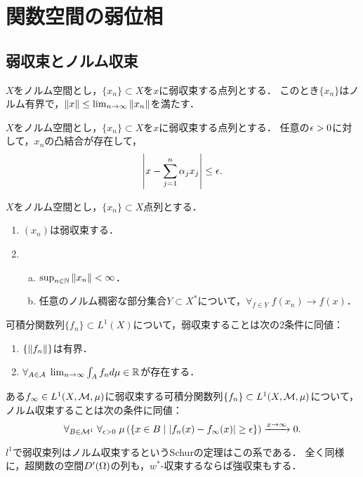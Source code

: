 \documentclass[uplatex,dvipdfmx]{jsreport}
\begin{document}
\section{関数空間の弱位相}

\subsection{弱収束とノルム収束}

\begin{theorem}
    $X$をノルム空間とし，$\{x_n\}\subset X$を$x$に弱収束する点列とする．
    このとき$\{x_n\}$はノルム有界で，$\|x\|\le\lim_{n\to\infty}\|x_n\|$を満たす．
\end{theorem}

\begin{theorem}[Mazur]
    $X$をノルム空間とし，$\{x_n\}\subset X$を$x$に弱収束する点列とする．
    任意の$\epsilon>0$に対して，$x_n$の凸結合が存在して，
    \[\left|x-\sum_{j=1}^n\alpha_jx_j\right|\le\epsilon.\]
\end{theorem}

\begin{theorem}
    $X$をノルム空間とし，$\{x_n\}\subset X$点列とする．
    \begin{enumerate}
        \item $(x_n)$は弱収束する．
        \item \begin{enumerate}[(a)]
            \item $\sup_{n\in\mathbb{N}}\|x_n\|<\infty$．
            \item 任意のノルム稠密な部分集合$Y\subset X^*$について，$\forall_{f\in Y}\;f(x_n)\to f(x)$．
        \end{enumerate}
    \end{enumerate}
\end{theorem}

\begin{corollary}
    可積分関数列$\{f_n\}\subset L^1(X)$について，弱収束することは次の2条件に同値：
    \begin{enumerate}
        \item $\{\|f_n\|\}$は有界．
        \item $\forall_{A\in\mathcal{A}}\;\lim_{n\to\infty}\int_Af_nd\mu\in\mathbb{R}$が存在する．
    \end{enumerate}
\end{corollary}

\begin{corollary}
    ある$f_\infty\in L^1(X,\mathcal{M},\mu)$に弱収束する可積分関数列$\{f_n\}\subset L^1(X,\mathcal{M},\mu)$について，ノルム収束することは次の条件に同値：
    \[\forall_{B\in\mathcal{M}^1}\;\forall_{\epsilon>0}\;\mu\left(\left\{x\in B\mid\lvert f_n(x)-f_\infty(x)\rvert\ge\epsilon\right\}\right)\xrightarrow{x\to\infty}0.\]
\end{corollary}
\begin{remarks}
    $l^1$で弱収束列はノルム収束するというSchurの定理はこの系である．
    全く同様に，超関数の空間$D'(\Omega)$の列も，$w^*$-収束するならば強収束もする．
\end{remarks}
\end{document}
